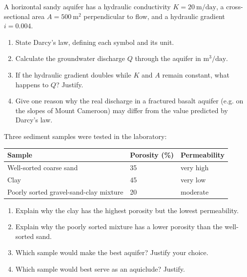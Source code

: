 \documentclass[11pt]{article}
\begin{document}
\begin{exercice}
A horizontal sandy aquifer has a hydraulic conductivity $K = 20\ \mathrm{m/day}$, a cross-sectional area $A = 500\ \mathrm{m^2}$ perpendicular to flow, and a hydraulic gradient $i = 0.004$.
\begin{enumerate}
\item State Darcy's law, defining each symbol and its unit.
\item Calculate the groundwater discharge $Q$ through the aquifer in $\mathrm{m^3/day}$.
\item If the hydraulic gradient doubles while $K$ and $A$ remain constant, what happens to $Q$? Justify.
\item Give one reason why the real discharge in a fractured basalt aquifer (e.g. on the slopes of Mount Cameroon) may differ from the value predicted by Darcy's law.
\end{enumerate}
\end{exercice}

\begin{exercice}
Three sediment samples were tested in the laboratory:

\begin{center}
\begin{tabularx}{\linewidth}{|l|X|X|}
\hline
\rowcolor{popblueL} Sample & Porosity (\%) & Permeability \\
\hline
Well-sorted coarse sand & 35 & very high \\
\hline
Clay & 45 & very low \\
\hline
Poorly sorted gravel-sand-clay mixture & 20 & moderate \\
\hline
\end{tabularx}
\end{center}

\begin{enumerate}
\item Explain why the clay has the highest porosity but the lowest permeability.
\item Explain why the poorly sorted mixture has a lower porosity than the well-sorted sand.
\item Which sample would make the best aquifer? Justify your choice.
\item Which sample would best serve as an aquiclude? Justify.
\end{enumerate}
\end{exercice}
\end{document}
